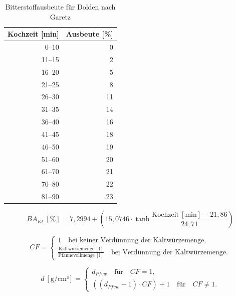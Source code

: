 \documentclass[a4paper,parskip=half]{scrartcl}
\newcommand{\BAKt}{{\mathit{BA}}_{\mathit{Kt}}}
\newcommand{\umin}{\:[\textrm{min}]}
\newcommand{\uden}{\:[\text{g/cm³}]}
\newcommand{\uper}{\:[\text{\%}]}
\newcommand{\uli}{\:[\text{l}]}
\newcommand{\dPfvw}{d_\mathit{Pfvw}}
\begin{document}
\begin{table}[H]
\centering
\begin{tabular}{rr}
\toprule
\multicolumn{1}{c}{\textbf{Kochzeit [min]}} & \multicolumn{1}{c}{\textbf{Ausbeute [\%]}} \\
\midrule
0–10            & 0 \\
11–15           & 2 \\
16–20           & 5 \\
21–25           & 8 \\
26–30           & 11 \\
31–35           & 14 \\
36–40           & 16 \\
41–45           & 18 \\
46–50           & 19 \\
51–60           & 20 \\
61–70           & 21 \\
70–80           & 22 \\
81–90           & 23 \\
\bottomrule
\end{tabular}
\caption{Bitterstoffausbeute für Dolden nach Garetz \parencite[138]{Garetz1994}}
\label{table:garetzbakt}
\end{table}

\begin{equation}
\BAKt \uper = 7,2994 + \left(15,0746 \cdot \tanh{\frac{\text{Kochzeit} \umin - 21,86}{24,71}}\right)
\label{eq:garetzbakt}
\end{equation}


\begin{equation}
\mathit{CF} = \begin{cases}
1 \quad \text{bei keiner Verdünnung der Kaltwürzemenge}, \\
\frac{\text{Kaltwürzemenge} \uli}{\text{Pfannevollmenge} \uli} \quad \text{bei Verdünnung der Kaltwürzemenge}.
\end{cases}
\label{eq:garetzcf}
\end{equation}

\begin{equation}
d \uden = \begin{cases}
\dPfvw \quad \text{für} \quad \mathit{CF} = 1, \\
\left( \left( \dPfvw - 1 \right) \cdot \mathit{CF} \right) + 1 \quad \text{für} \quad \mathit{CF} \ne 1.
\end{cases}
\label{eq:garetzbg}
\end{equation}
\end{document}

